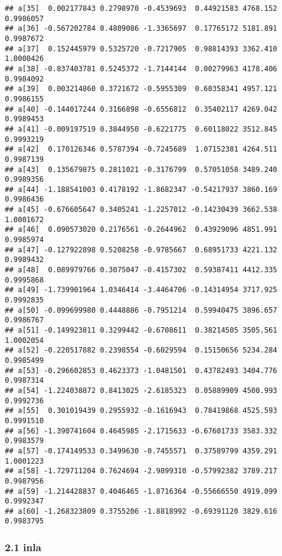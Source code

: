 \documentclass[
]{article}
\begin{document}
\begin{verbatim}
## a[35]  0.002177843 0.2798970 -0.4539693  0.44921583 4768.152 0.9986057
## a[36] -0.567202784 0.4809086 -1.3365697  0.17765172 5181.891 0.9987672
## a[37]  0.152445979 0.5325720 -0.7217905  0.98814393 3362.410 1.0000426
## a[38] -0.837403781 0.5245372 -1.7144144  0.00279963 4178.406 0.9984092
## a[39]  0.003214860 0.3721672 -0.5955309  0.60358341 4957.121 0.9986155
## a[40] -0.144017244 0.3166898 -0.6556812  0.35402117 4269.042 0.9989453
## a[41] -0.009197519 0.3844950 -0.6221775  0.60118022 3512.845 0.9993219
## a[42]  0.170126346 0.5787394 -0.7245689  1.07152381 4264.511 0.9987139
## a[43]  0.135679875 0.2811021 -0.3176799  0.57051058 3489.240 0.9989356
## a[44] -1.188541003 0.4178192 -1.8682347 -0.54217937 3860.169 0.9986436
## a[45] -0.676605647 0.3405241 -1.2257012 -0.14230439 3662.538 1.0001672
## a[46]  0.090573020 0.2176561 -0.2644962  0.43929096 4851.991 0.9985974
## a[47] -0.127922898 0.5208258 -0.9785667  0.68951733 4221.132 0.9989432
## a[48]  0.089979766 0.3075047 -0.4157302  0.59387411 4412.335 0.9995868
## a[49] -1.739901964 1.0346414 -3.4464706 -0.14314954 3717.925 0.9992835
## a[50] -0.099699980 0.4448886 -0.7951214  0.59940475 3896.657 0.9986767
## a[51] -0.149923811 0.3299442 -0.6708611  0.38214505 3505.561 1.0002054
## a[52] -0.220517882 0.2398554 -0.6029594  0.15150656 5234.284 0.9985499
## a[53] -0.296602853 0.4623373 -1.0481501  0.43782493 3404.776 0.9987314
## a[54] -1.224038872 0.8413025 -2.6185323  0.05889909 4500.993 0.9992736
## a[55]  0.301019439 0.2955932 -0.1616943  0.78419868 4525.593 0.9991510
## a[56] -1.390741604 0.4645985 -2.1715633 -0.67601733 3583.332 0.9983579
## a[57] -0.174149533 0.3499630 -0.7455571  0.37589799 4359.291 1.0001223
## a[58] -1.729711204 0.7624694 -2.9899310 -0.57992382 3789.217 0.9987956
## a[59] -1.214428837 0.4046465 -1.8716364 -0.55666550 4919.099 0.9992347
## a[60] -1.268323809 0.3755206 -1.8818992 -0.69391120 3829.616 0.9983795
\end{verbatim}

\hypertarget{inla-5}{%
\subsubsection{2.1 inla}\label{inla-5}}
\end{document}
